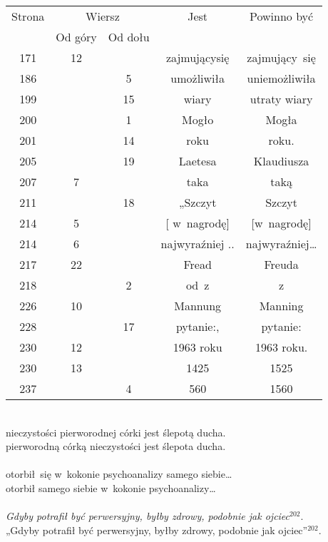 \documentclass[a4paper,11pt]{article}
\begin{document}
\begin{center}
  \begin{tabular}{|c|c|c|c|c|}
    \hline
    Strona & \multicolumn{2}{c|}{Wiersz} & Jest
                              & Powinno być \\ \cline{2-3}
    & Od góry & Od dołu & & \\
    \hline
    171 & 12 & & zajmującysię & zajmujący~się \\
    186 & &  5 & umożliwiła & uniemożliwiła \\
    199 & & 15 & wiary & utraty wiary \\
    200 & &  1 & Mogło & Mogła \\
    201 & & 14 & roku & roku. \\
    205 & & 19 & Laetesa & Klaudiusza \\
    207 &  7 & & taka & taką \\
    211 & & 18 & „Szczyt & Szczyt \\
    214 &  5 & & [ w~nagrodę] & [w~nagrodę] \\
    214 &  6 & & najwyraźniej .. & najwyraźniej\ldots \\
    217 & 22 & & Fread & Freuda \\
    218 & &  2 & od~z & z \\
    226 & 10 & & Mannung & Manning \\
    228 & & 17 & pytanie:, & pytanie: \\
    230 & 12 & & 1963 roku & 1963 roku. \\
    230 & 13 & & 1425 & 1525 \\
    237 & &  4 & 560 & 1560 \\
    \hline
  \end{tabular}

\end{center}

\vspace{\spaceTwo}


\noindent
{} \\
\Jest  nieczystości pierworodnej córki jest ślepotą ducha. \\
\Powin pierworodną córką nieczystości jest ślepota ducha. \\
 \\
\Jest  otorbił~się w~kokonie psychoanalizy samego siebie\ldots \\
\Powin otorbił samego siebie w~kokonie psychoanalizy\ldots \\
 \\
\Jest  \textit{Gdyby potrafił być perwersyjny, byłby zdrowy, podobnie jak
  ojciec$^{ 202 }$}. \\
\Powin „Gdyby potrafił być perwersyjny, byłby zdrowy,
podobnie jak ojciec”$^{ 202 }$. \\
\end{document}
